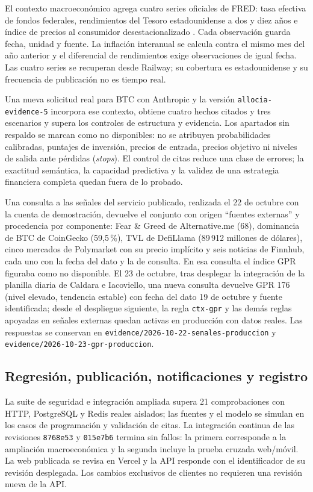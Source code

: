 El contexto macroeconómico agrega cuatro series oficiales de FRED: tasa efectiva de fondos federales, rendimientos del Tesoro estadounidense a dos y diez años e índice de precios al consumidor desestacionalizado \parencite{FREDDFF,FREDCPI}. Cada observación guarda fecha, unidad y fuente. La inflación interanual se calcula contra el mismo mes del año anterior y el diferencial de rendimientos exige observaciones de igual fecha. Las cuatro series se recuperan desde Railway; su cobertura es estadounidense y su frecuencia de publicación no es tiempo real.

Una nueva solicitud real para BTC con Anthropic y la versión \texttt{allocia-evidence-5} incorpora ese contexto, obtiene cuatro hechos citados y tres escenarios y supera los controles de estructura y evidencia. Los apartados sin respaldo se marcan como no disponibles: no se atribuyen probabilidades calibradas, puntajes de inversión, precios de entrada, precios objetivo ni niveles de salida ante pérdidas (\textit{stops}). El control de citas reduce una clase de errores; la exactitud semántica, la capacidad predictiva y la validez de una estrategia financiera completa quedan fuera de lo probado.

Una consulta a las señales del servicio publicado, realizada el 22 de octubre con la cuenta de demostración, devuelve el conjunto con origen \enquote{fuentes externas} y procedencia por componente: Fear \& Greed de Alternative.me (68), dominancia de BTC de CoinGecko (59,5\,\%), TVL de DefiLlama (89\,912 millones de dólares), cinco mercados de Polymarket con su precio implícito y seis noticias de Finnhub, cada uno con la fecha del dato y la de consulta. En esa consulta el índice GPR figuraba como no disponible. El 23 de octubre, tras desplegar la integración de la planilla diaria de Caldara e Iacoviello, una nueva consulta devuelve GPR 176 (nivel elevado, tendencia estable) con fecha del dato 19 de octubre y fuente identificada; desde el despliegue siguiente, la regla \texttt{ctx-gpr} y las demás reglas apoyadas en señales externas quedan activas en producción con datos reales. Las respuestas se conservan en \texttt{evidence/2026-10-22-senales-produccion} y \texttt{evidence/2026-10-23-gpr-produccion}.

\subsection{Regresión, publicación, notificaciones y registro}

La suite de seguridad e integración ampliada supera 21 comprobaciones con HTTP, PostgreSQL y Redis reales aislados; las fuentes y el modelo se simulan en los casos de programación y validación de citas. La integración continua de las revisiones \texttt{8768e53} y \texttt{015e7b6} termina sin fallos: la primera corresponde a la ampliación macroeconómica y la segunda incluye la prueba cruzada web/móvil. La web publicada se revisa en Vercel y la API responde con el identificador de su revisión desplegada. Los cambios exclusivos de clientes no requieren una revisión nueva de la API.

